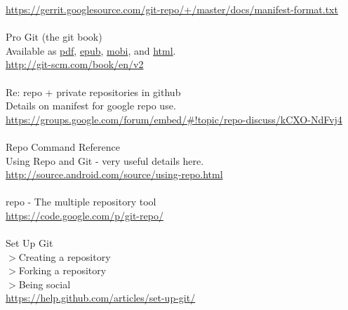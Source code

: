 \documentclass[12pt,letterpaper,dvips]{article}
\begin{document}
\href{https://gerrit.googlesource.com/git-repo/+/master/docs/manifest-format.txt}{https://gerrit.googlesource.com/git-repo/+/master/docs/manifest-format.txt}
\\
\\
\noindent Pro Git (the git book)\\
Available as
  \href{https://progit2.s3.amazonaws.com/en/2015-08-09-23511/progit-en.661.pdf}{pdf},
  \href{https://progit2.s3.amazonaws.com/en/2015-08-09-23511/progit-en.661.epub}{epub},
  \href{https://progit2.s3.amazonaws.com/en/2015-08-09-23511/progit-en.661.mobi}{mobi},
  and \href{https://progit2.s3.amazonaws.com/en/2015-08-09-23511/progit-en.661.zip}{html}.\\
\href{http://git-scm.com/book/https://progit2.s3.amazonaws.com/en/2015-08-09-23511/progit-en.661.zipen/v2}{http://git-scm.com/book/en/v2}
\\
\\
Re: repo + private repositories in github\\
Details on manifest for google repo use.\\
\href{https://groups.google.com/forum/embed/\#!topic/repo-discuss/kCXO-NdFvj4}{https://groups.google.com/forum/embed/\#!topic/repo-discuss/kCXO-NdFvj4}
\\
\\
Repo Command Reference\\
Using Repo and Git - very useful details here.\\
\href{http://source.android.com/source/using-repo.html}{http://source.android.com/source/using-repo.html}
\\
\\
repo - The multiple repository tool\\
\href{https://code.google.com/p/git-repo/}{https://code.google.com/p/git-repo/}
\\
\\
Set Up Git\\
$>$Creating a repository\\
$>$Forking a repository\\
$>$Being social\\
\href{https://help.github.com/articles/set-up-git/}{https://help.github.com/articles/set-up-git/}
\\
\\
\end{document}
